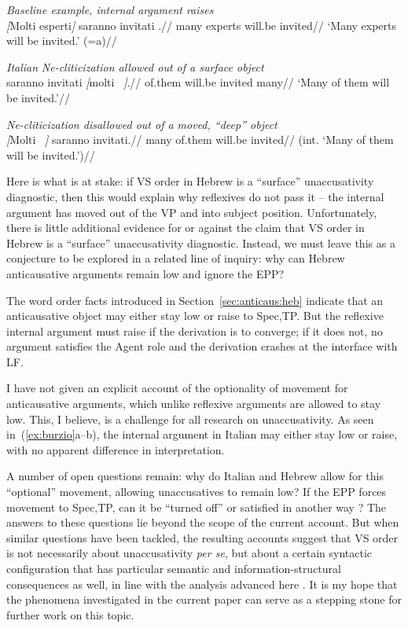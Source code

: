 \a \textit{Baseline example, internal argument raises}\\
\begingl
\gla \emph{[}Molti esperti\emph{]} saranno invitati \trace .//
\glb many experts will.be invited//
	\glft`Many experts will be invited.' (=a)//
\endgl
\xe

\pex \textit{Italian}
\a \textit{\emph{Ne}-cliticization allowed out of a surface object}\\
\begingl
\gla {} saranno invitati \emph{[}molti \trace~\emph{]}.//
\glb of.them will.be invited many//
\glft `Many of them will be invited.'//
\endgl

\a \ljudge{*} \textit{\emph{Ne}-cliticization disallowed out of a moved, ``deep'' object}\\
\begingl
\gla \emph{[}Molti {\trace}~\emph{]}  saranno invitati.//
\glb many {} of.them will.be invited//
\glft (int. `Many of them will be invited.')//
\endgl
\xe

Here is what is at stake: if VS order in Hebrew is a ``surface'' unaccusativity diagnostic, then this would explain why reflexives do not pass it -- the internal argument has moved out of the VP and into subject position. Unfortunately, there is little additional evidence for or against the claim that VS order in Hebrew is a ``surface'' unaccusativity diagnostic. Instead, we must leave this as a conjecture to be explored in a related line of inquiry: why can Hebrew anticausative arguments remain low and ignore the EPP?

The word order facts introduced in Section~\ref{sec:anticaus:heb} indicate that an anticausative object may either stay low or raise to Spec,TP. But the reflexive internal argument must raise if the derivation is to converge; if it does not, no argument satisfies the Agent role and the derivation crashes at the interface with LF.

I have not given an explicit account of the optionality of movement for anticausative arguments, which unlike reflexive arguments are allowed to stay low. This, I believe, is a challenge for all research on unaccusativity. As seen in~(\ref{ex:burzio}a--b), the internal argument in Italian may either stay low or raise, with no apparent difference in interpretation.

A number of open questions remain: why do Italian and Hebrew allow for this ``optional'' movement, allowing unaccusatives to remain low? If the EPP forces movement to Spec,TP, can it be ``turned off'' or satisfied in another way \citep{alexiadouanagnostopoulou98}? The answers to these questions lie beyond the scope of the current account. But when similar questions have been tackled, the resulting accounts suggest that VS order is not necessarily about unaccusativity \emph{per se}, but about a certain syntactic configuration that has particular semantic and information-structural consequences as well, in line with the analysis advanced here \citep{borer05vol2,alexiadou11oup}. It is my hope that the phenomena investigated in the current paper can serve as a stepping stone for further work on this topic.

